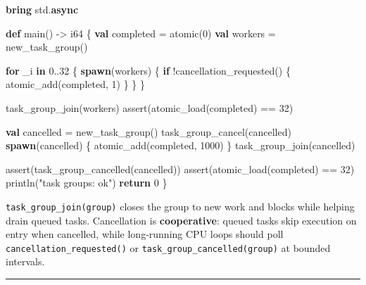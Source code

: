 \documentclass[
  english,
  oneside]{book}
\newenvironment{Shaded}{\begin{snugshade}}{\end{snugshade}}
\newcommand{\ControlFlowTok}[1]{\textcolor[rgb]{0.77,0.53,0.75}{\textbf{#1}}}
\newcommand{\DataTypeTok}[1]{\textcolor[rgb]{0.31,0.79,0.69}{#1}}
\newcommand{\DecValTok}[1]{\textcolor[rgb]{0.71,0.81,0.66}{#1}}
\newcommand{\FunctionTok}[1]{\textcolor[rgb]{0.86,0.86,0.67}{#1}}
\newcommand{\KeywordTok}[1]{\textcolor[rgb]{0.34,0.61,0.84}{\textbf{#1}}}
\newcommand{\NormalTok}[1]{\textcolor[rgb]{0.83,0.83,0.83}{#1}}
\newcommand{\OperatorTok}[1]{\textcolor[rgb]{0.83,0.83,0.83}{#1}}
\newcommand{\StringTok}[1]{\textcolor[rgb]{0.81,0.57,0.47}{#1}}
\begin{document}
\begin{Shaded}
\begin{Highlighting}[]
\KeywordTok{bring}\NormalTok{ std}\OperatorTok{.}\KeywordTok{async}

\KeywordTok{def}\NormalTok{ main() }\OperatorTok{{-}\textgreater{}} \DataTypeTok{i64}\NormalTok{ \{}
    \KeywordTok{val}\NormalTok{ completed }\OperatorTok{=} \DataTypeTok{atomic}\NormalTok{(}\DecValTok{0}\NormalTok{)}
    \KeywordTok{val}\NormalTok{ workers }\OperatorTok{=}\NormalTok{ new\_task\_group()}

    \ControlFlowTok{for}\NormalTok{ \_i }\ControlFlowTok{in} \DecValTok{0}\OperatorTok{..}\DecValTok{32}\NormalTok{ \{}
        \KeywordTok{spawn}\NormalTok{(workers) \{}
            \ControlFlowTok{if} \OperatorTok{!}\NormalTok{cancellation\_requested() \{}
                \FunctionTok{atomic\_add}\NormalTok{(completed, }\DecValTok{1}\NormalTok{)}
\NormalTok{            \}}
\NormalTok{        \}}
\NormalTok{    \}}

\NormalTok{    task\_group\_join(workers)}
    \FunctionTok{assert}\NormalTok{(}\FunctionTok{atomic\_load}\NormalTok{(completed) }\OperatorTok{==} \DecValTok{32}\NormalTok{)}

    \KeywordTok{val}\NormalTok{ cancelled }\OperatorTok{=}\NormalTok{ new\_task\_group()}
\NormalTok{    task\_group\_cancel(cancelled)}
    \KeywordTok{spawn}\NormalTok{(cancelled) \{}
        \FunctionTok{atomic\_add}\NormalTok{(completed, }\DecValTok{1000}\NormalTok{)}
\NormalTok{    \}}
\NormalTok{    task\_group\_join(cancelled)}

    \FunctionTok{assert}\NormalTok{(task\_group\_cancelled(cancelled))}
    \FunctionTok{assert}\NormalTok{(}\FunctionTok{atomic\_load}\NormalTok{(completed) }\OperatorTok{==} \DecValTok{32}\NormalTok{)}
\NormalTok{    println(}\StringTok{"task groups: ok"}\NormalTok{)}
    \ControlFlowTok{return} \DecValTok{0}
\NormalTok{\}}
\end{Highlighting}
\end{Shaded}

\texttt{task\_group\_join(group)} closes the group to new work and
blocks while helping drain queued tasks. Cancellation is
\textbf{cooperative}: queued tasks skip execution on entry when
cancelled, while long-running CPU loops should poll
\texttt{cancellation\_requested()} or
\texttt{task\_group\_cancelled(group)} at bounded intervals.

\begin{center}\rule{0.5\linewidth}{0.5pt}\end{center}
\end{document}
